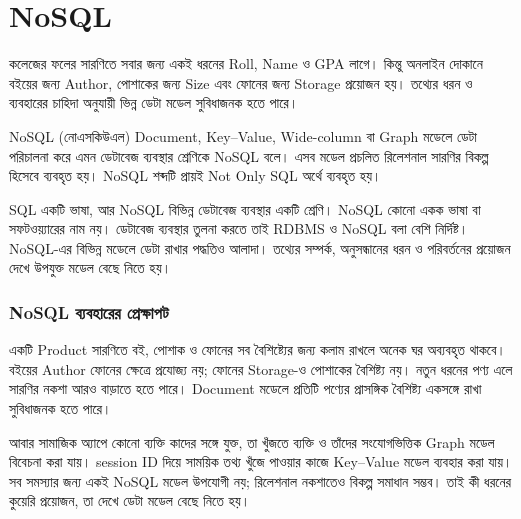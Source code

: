 \section{NoSQL}
\label{sec:ch06-nosql}
কলেজের ফলের সারণিতে সবার জন্য একই ধরনের Roll, Name ও GPA লাগে। কিন্তু অনলাইন দোকানে বইয়ের জন্য Author, পোশাকের জন্য Size এবং ফোনের জন্য Storage প্রয়োজন হয়। তথ্যের ধরন ও ব্যবহারের চাহিদা অনুযায়ী ভিন্ন ডেটা মডেল সুবিধাজনক হতে পারে।
\begin{definitionbox}{NoSQL (নোএসকিউএল)}
Document, Key--Value, Wide-column বা Graph মডেলে ডেটা পরিচালনা করে এমন ডেটাবেজ ব্যবস্থার শ্রেণিকে NoSQL বলে। এসব মডেল প্রচলিত রিলেশনাল সারণির বিকল্প হিসেবে ব্যবহৃত হয়। NoSQL শব্দটি প্রায়ই Not Only SQL অর্থে ব্যবহৃত হয়।
\end{definitionbox}
SQL একটি ভাষা, আর NoSQL বিভিন্ন ডেটাবেজ ব্যবস্থার একটি শ্রেণি। NoSQL কোনো একক ভাষা বা সফটওয়্যারের নাম নয়। ডেটাবেজ ব্যবস্থার তুলনা করতে তাই RDBMS ও NoSQL বলা বেশি নির্দিষ্ট। NoSQL-এর বিভিন্ন মডেলে ডেটা রাখার পদ্ধতিও আলাদা। তথ্যের সম্পর্ক, অনুসন্ধানের ধরন ও পরিবর্তনের প্রয়োজন দেখে উপযুক্ত মডেল বেছে নিতে হয়।


\subsubsection{NoSQL ব্যবহারের প্রেক্ষাপট}
একটি Product সারণিতে বই, পোশাক ও ফোনের সব বৈশিষ্ট্যের জন্য কলাম রাখলে অনেক ঘর অব্যবহৃত থাকবে। বইয়ের Author ফোনের ক্ষেত্রে প্রযোজ্য নয়; ফোনের Storage-ও পোশাকের বৈশিষ্ট্য নয়। নতুন ধরনের পণ্য এলে সারণির নকশা আরও বাড়াতে হতে পারে। Document মডেলে প্রতিটি পণ্যের প্রাসঙ্গিক বৈশিষ্ট্য একসঙ্গে রাখা সুবিধাজনক হতে পারে।

আবার সামাজিক অ্যাপে কোনো ব্যক্তি কাদের সঙ্গে যুক্ত, তা খুঁজতে ব্যক্তি ও তাঁদের সংযোগভিত্তিক Graph মডেল বিবেচনা করা যায়। session ID দিয়ে সাময়িক তথ্য খুঁজে পাওয়ার কাজে Key--Value মডেল ব্যবহার করা যায়। সব সমস্যার জন্য একই NoSQL মডেল উপযোগী নয়; রিলেশনাল নকশাতেও বিকল্প সমাধান সম্ভব। তাই কী ধরনের কুয়েরি প্রয়োজন, তা দেখে ডেটা মডেল বেছে নিতে হয়।

